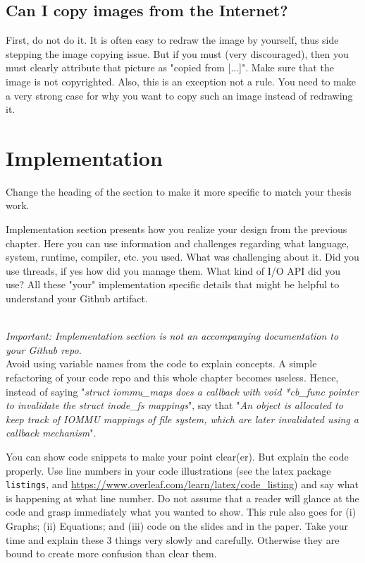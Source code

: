 \documentclass[11pt]{article}
\begin{document}
\subsection*{Can I copy images from the Internet?}

First, do not do it. It is often easy to redraw the image by yourself, thus side stepping the image copying issue. But if you must (very discouraged), then you must clearly attribute that picture as "copied from [...]". Make sure that the image is not copyrighted. Also, this is an exception not a rule. You need to make a very strong case for why you want to copy such an image instead of redrawing it. 

\newpage 
\section{Implementation} 
Change the heading of the section to make it more specific to match your thesis work. 

Implementation section presents how you realize your design from the previous chapter. Here you can use information and challenges regarding what language, system, runtime, compiler, etc. you used. What was challenging about it. Did you use threads, if yes how did you manage them. What kind of I/O API did you use? All these "your" implementation specific details that might be helpful to understand your Github artifact. 

$ $\\
\textit{Important: Implementation section is not an accompanying documentation to your Github repo.} $ $\\

Avoid using variable names from the code to explain concepts. A simple refactoring of your code repo and this whole chapter becomes useless. Hence, instead of saying "\textit{struct iommu\_maps does a callback with void *cb\_func pointer to invalidate the struct inode\_fs mappings}", say that "\textit{An object is allocated to keep track of IOMMU mappings of file system, which are later invalidated using a callback mechanism}". 

You can show code snippets to make your point clear(er). But explain the code properly. Use line numbers in your code illustrations (see the latex package \texttt{listings}, and \url{https://www.overleaf.com/learn/latex/code_listing}) and say what is happening at what line number. Do not assume that a reader will glance at the code and grasp immediately what you wanted to show. This rule also goes for (i) Graphs; (ii) Equations; and (iii) code on the slides and in the paper. Take your time and explain these 3 things very slowly and carefully. Otherwise they are bound to create more confusion than clear them. 
\end{document}
